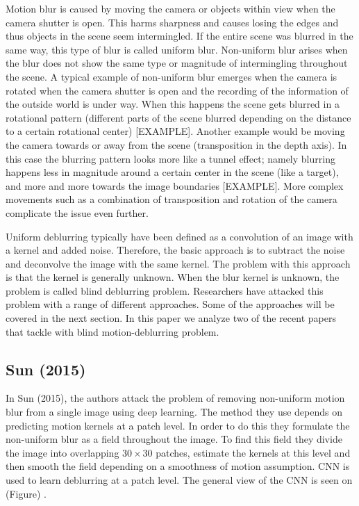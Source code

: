 \documentclass[10pt,twocolumn,letterpaper]{article}
\begin{document}
Motion blur is caused by moving the camera or objects within view when the camera shutter is open. This harms sharpness and causes losing the edges and thus objects in the scene seem intermingled. If the entire scene was blurred in the same way, this type of blur is called uniform blur. Non-uniform blur arises when the blur does not show the same type or magnitude of intermingling throughout the scene. A typical example of non-uniform blur emerges when the camera is rotated when the camera shutter is open and the recording of the information of the outside world is under way. When this happens the scene gets blurred in a rotational pattern (different parts of the scene blurred depending on the distance to a certain rotational center) [EXAMPLE]. Another example would be moving the camera towards or away from the scene (transposition in the depth axis). In this case the blurring pattern looks more like a tunnel effect; namely blurring happens less in magnitude around a certain center in the scene (like a target), and more and more towards the image boundaries [EXAMPLE]. More complex movements such as a combination of transposition and rotation of the camera complicate the issue even further.

Uniform deblurring typically have been defined as a convolution of an image with a kernel and added noise. Therefore, the basic approach is to subtract the noise and deconvolve the image with the same kernel. The problem with this approach is that the kernel is generally unknown. When the blur kernel is unknown, the problem is called blind deblurring problem. Researchers have attacked this problem with a range of different approaches. Some of the approaches will be covered in the next section. In this paper we analyze two of the recent papers that tackle with blind motion-deblurring problem.

\subsection{Sun \textbf{\etal} (2015)}

In Sun \etal (2015), the authors attack the problem of removing non-uniform motion blur from a single image using deep learning. The method they use depends on predicting motion kernels at a patch level. In order to do this they formulate the non-uniform blur as a field throughout the image. To find this field they divide the image into overlapping $30 \times 30$ patches, estimate the kernels at this level and then smooth the field depending on a smoothness of motion assumption. CNN is used to learn deblurring at a patch level. The general view of the CNN is seen on (Figure) \cite{sun2015learning}.
\end{document}
